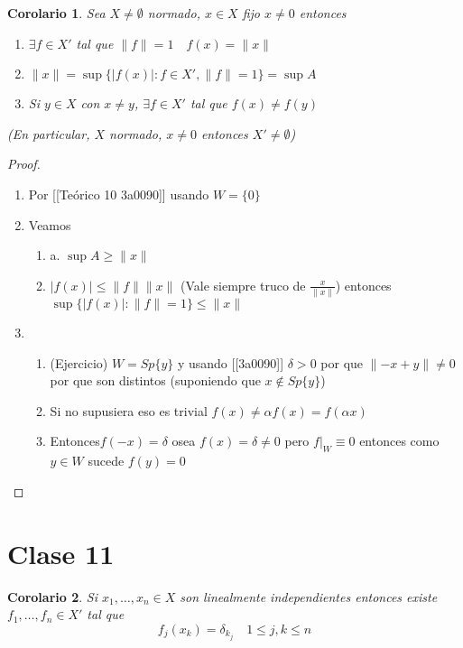 \documentclass[10pt]{extarticle}
\theoremstyle{break}
\newtheorem{corollary}{Corolario}[theorem]
\theoremstyle{definition}
\begin{document}
\begin{corollary}\label{10.0}
	Sea $X\neq \emptyset$ normado, $x\in X$ fijo $x\neq 0$ entonces 
	\begin{enumerate}[(a.)]
		\item $\exists f\in X'$ tal que $\lVert f \rVert =1 \quad f(x)=\lVert x \rVert$
		\item $\lVert x \rVert=\sup \{ \lvert f(x) \rvert : f\in X',\lVert f \rVert=1\} =\sup A$
		\item Si $y\in X$ con $x\neq y$, $\exists f\in X'$ tal que $f(x)\neq f(y)$
	\end{enumerate}	(En particular, $X$ normado, $x\neq 0$ entonces $X'\neq \emptyset$)
\end{corollary}

\begin{proof}
	\begin{enumerate}[(a.)]
		\item Por [[Teórico 10 3a0090]] usando $W=\{ 0 \}$
		\item Veamos
			\begin{enumerate}
				\item a. $\sup A \geq \lVert x \rVert$
				\item $\lvert f(x) \rvert\leq \lVert f \rVert\lVert x \rVert$ (Vale siempre truco de $\frac{x}{\lVert x \rVert}$) entonces $\sup \{\lvert f(x) \rvert:\lVert f \rVert=1\}\leq \lVert x \rVert$
			\end{enumerate} 
		\item  \begin{enumerate}
				\item (Ejercicio) $W=Sp\{ y \}$ y usando [[3a0090]] $\delta >0$ por que $\lVert -x+y \rVert\neq 0$ por que son distintos (suponiendo que $x \not\in Sp\{ y \}$)
				\item Si no supusiera eso es trivial $f(x)\neq \alpha f(x) = f(\alpha x)$
				\item Entonces$f(-x)=\delta$ osea $f(x)=\delta\neq 0$ pero $f|_{W}\equiv 0$ entonces como $y\in W$ sucede $f(y)=0$\end{enumerate}
	\end{enumerate}

\end{proof}

\section{Clase 11}

\begin{corollary}
Si $x_{1},\ldots,x_{n} \in X$ son linealmente independientes entonces existe $f_{1},\ldots,f_{n}\in X'$ tal que $$f_{j}(x_{k})=\delta_{k_{j}} \quad 1\leq j,k\leq n$$
\end{corollary}
\end{document}
